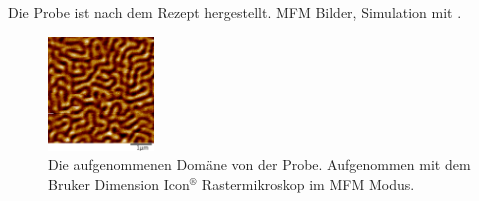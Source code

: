 Die Probe ist nach dem Rezept \cite{tripathi_dichroic_2011} hergestellt. MFM Bilder, Simulation mit \cite{schick_udkm1dsim_2021}.
\begin{figure}[h]
    \centering
    \includegraphics[width=0.25\textwidth]{images/ds220126_R1_membrane_amplitude_cropped.png}
    \caption{Die aufgenommenen Domäne von der Probe. Aufgenommen mit dem Bruker Dimension Icon$^{\text{®}}$ Rastermikroskop im MFM Modus.}
    \label{fig:mfm_amplitude}
\end{figure}

\newpage